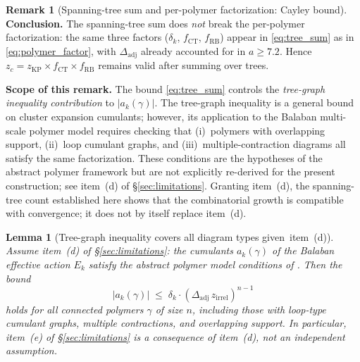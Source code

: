 \documentclass[11pt,a4paper]{amsart}
\newtheorem{lemma}[theorem]{Lemma}
\theoremstyle{definition}
\newtheorem{remark}[theorem]{Remark}
\newcommand{\zKP}{z_{\mathrm{KP}}}
\newcommand{\CT}{\mathrm{CT}}
\begin{document}
\begin{remark}[Spanning-tree sum and per-polymer factorization: Cayley bound]
\textbf{Conclusion.}  The spanning-tree sum does \emph{not} break the
per-polymer factorization: the same three factors
($\delta_k$, $f_{\mathrm{CT}}$, $f_{\mathrm{RB}}$) appear in \eqref{eq:tree_sum}
as in \eqref{eq:polymer_factor}, with $\Delta_{\mathrm{adj}}$ already
accounted for in $a \ge 7.2$.  Hence $z_c = \zKP \times f_{\CT} \times f_{\mathrm{RB}}$
remains valid after summing over trees.

\textbf{Scope of this remark.}  The bound \eqref{eq:tree_sum} controls the
\emph{tree-graph inequality contribution} to $|a_k(\gamma)|$.  The tree-graph
inequality \cite[Prop.~2.3]{B87} is a general bound on cluster expansion
cumulants; however, its application to the Balaban multi-scale polymer model
requires checking that (i)~polymers with overlapping support, (ii)~loop
cumulant graphs, and (iii)~multiple-contraction diagrams all satisfy the same
factorization.  These conditions are the hypotheses of the abstract polymer framework
\cite{KP86} but are not explicitly re-derived for the present construction;
see item~(d) of \S\ref{sec:limitations}.  Granting item~(d), the spanning-tree
count established here shows that the combinatorial growth is compatible with
convergence; it does not by itself replace item~(d).
\end{remark}

\begin{lemma}[Tree-graph inequality covers all diagram types given~item~(d)]
\label{lem:tree_complete}
\emph{Assume} item~\textup{(d)} of \S\ref{sec:limitations}: the cumulants
$a_k(\gamma)$ of the Balaban effective action $E_k$ satisfy the abstract
polymer model conditions of \textup{\cite{KP86,B87}}.
Then the bound
\begin{equation}
\label{eq:tree_complete}
  |a_k(\gamma)| \;\le\; \delta_k \cdot (\Delta_{\mathrm{adj}}\,z_{\mathrm{irrel}})^{n-1}
\end{equation}
holds for \emph{all} connected polymers $\gamma$ of size $n$, including those
with loop-type cumulant graphs, multiple contractions, and overlapping support.
In particular, item~\textup{(e)} of \S\ref{sec:limitations} is a
\emph{consequence of item~\textup{(d)}}, not an independent assumption.
\end{lemma}
\end{document}

